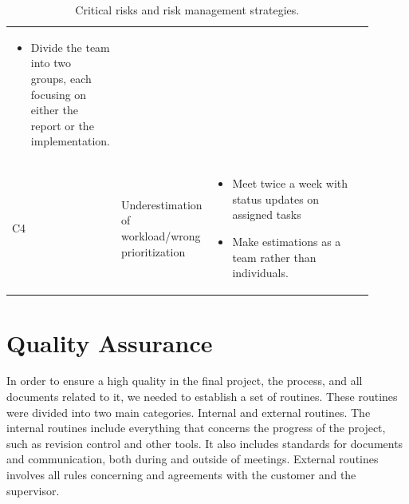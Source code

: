 \begin{landscape}
\begin{table}[htbp]
\begin{tabular}{|p{0.07\linewidth}|p{0.20\linewidth}|p{0.63\linewidth}|}
      \begin{itemize}
        \item Divide the team into two groups, each focusing on either the report or the implementation.
      \end{itemize} \\
    C4 & Underestimation of workload/wrong prioritization &
      \begin{itemize}
        \item Meet twice a week with status updates on assigned tasks
        \item Make estimations as a team rather than individuals.
      \end{itemize} \\
    \hline
\end{tabular}
\caption{Critical risks and risk management strategies. \label{tab:PlanningRiskManCriticalRisks}}
\end{table}
\end{landscape}



\section{Quality Assurance}
\label{sec:PlanningQuality}
In order to ensure a high quality in the final project, the process, and all documents related to it, we needed to establish a set of routines. These routines were divided into two main categories. Internal and external routines. The internal routines include everything that concerns the progress of the project, such as revision control and other tools. It also includes standards for documents and communication, both during and outside of meetings. External routines involves all rules concerning and agreements with the customer and the supervisor.


